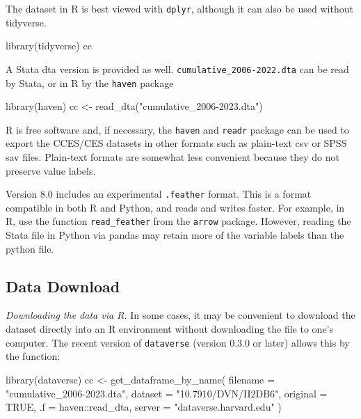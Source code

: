 \documentclass[10pt,article,oneside]{memoir}
\theoremstyle{definition}
\newenvironment{Shaded}{\begin{snugshade}}{\end{snugshade}}
\newcommand{\AttributeTok}[1]{\textcolor[rgb]{0.40,0.45,0.13}{#1}}
\newcommand{\ConstantTok}[1]{\textcolor[rgb]{0.56,0.35,0.01}{#1}}
\newcommand{\FunctionTok}[1]{\textcolor[rgb]{0.28,0.35,0.67}{#1}}
\newcommand{\NormalTok}[1]{\textcolor[rgb]{0.00,0.23,0.31}{#1}}
\newcommand{\OtherTok}[1]{\textcolor[rgb]{0.00,0.23,0.31}{#1}}
\newcommand{\SpecialCharTok}[1]{\textcolor[rgb]{0.37,0.37,0.37}{#1}}
\newcommand{\StringTok}[1]{\textcolor[rgb]{0.13,0.47,0.30}{#1}}
\begin{document}
\noindent The dataset in R is best viewed with \texttt{dplyr}, although
it can also be used without tidyverse.

\begin{Shaded}
\begin{Highlighting}[]
\FunctionTok{library}\NormalTok{(tidyverse)}
\NormalTok{cc}
\end{Highlighting}
\end{Shaded}

\noindent  A Stata dta version is provided as well.
\texttt{cumulative\_2006-2022.dta} can be read by Stata, or in R by the
\texttt{haven} package

\begin{Shaded}
\begin{Highlighting}[]
\FunctionTok{library}\NormalTok{(haven)}
\NormalTok{cc }\OtherTok{\textless{}{-}} \FunctionTok{read\_dta}\NormalTok{(}\StringTok{"cumulative\_2006{-}2023.dta"}\NormalTok{)}
\end{Highlighting}
\end{Shaded}

R is free software and, if necessary, the \texttt{haven} and
\texttt{readr} package can be used to export the CCES/CES datasets in
other formats such as plain-text csv or SPSS sav files. Plain-text
formats are somewhat less convenient because they do not preserve value
labels.

Version 8.0 includes an experimental \texttt{.feather} format. This is a
format compatible in both R and Python, and reads and writes faster. For
example, in R, use the function \texttt{read\_feather} from the
\texttt{arrow} package. However, reading the Stata file in Python via
pandas may retain more of the variable labels than the python file.

\subsection{Data Download}\label{data-download}

\noindent \emph{Downloading the data via R.} In some cases, it may be
convenient to download the dataset directly into an R environment
without downloading the file to one's computer. The recent version of
\texttt{dataverse} (version 0.3.0 or later) allows this by the function:

\begin{Shaded}
\begin{Highlighting}[]
\FunctionTok{library}\NormalTok{(dataverse)}
\NormalTok{cc }\OtherTok{\textless{}{-}} \FunctionTok{get\_dataframe\_by\_name}\NormalTok{(}
  \AttributeTok{filename =} \StringTok{"cumulative\_2006{-}2023.dta"}\NormalTok{,}
  \AttributeTok{dataset =} \StringTok{"10.7910/DVN/II2DB6"}\NormalTok{,}
  \AttributeTok{original =} \ConstantTok{TRUE}\NormalTok{,}
  \AttributeTok{.f =}\NormalTok{ haven}\SpecialCharTok{::}\NormalTok{read\_dta,}
  \AttributeTok{server =} \StringTok{"dataverse.harvard.edu"}
\NormalTok{)}
\end{Highlighting}
\end{Shaded}
\end{document}
